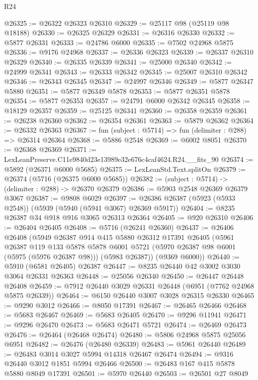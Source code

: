 \begin{lexlean}{R24}
\begin{coremodule}
@26325 := @26322 @26323 @26310
@26329 := @25117 @98 (@25119 @98 @18188)
@26330 := @26325 @26329
@26331 := @26316 @26330
@26332 := @5877 @26331
@26333 := @24786 @6000
@26335 := @7502 @24968 @5875
@26336 := @9176 @24968
@26337 := @26336 @26323
@26339 := @26337 @26310 @26329
@26340 := @26335 @26339
@26341 := @25000 @26340
@26342 := @24999 @26341
@26343 := @26333 @26342
@26345 := @25007 @26310 @26342
@26346 := @26343 @26345
@26347 := @24997 @26346
@26349 := @5877 @26347 @5880
@26351 := @5877 @26349 @5878
@26353 := @5877 @26351 @5878
@26354 := @5877 @26353
@26357 := @24791 @6000 @26342 @26345
@26358 := @18129 @26357
@26359 := @25125 @26341
@26360 := @26358 @26359
@26361 := @26238 @26360
@26362 := @26354 @26361
@26363 := @5879 @26362
@26364 := @26332 @26363
@26367 := fun (subject : @5714) => fun (delimiter : @288) => @26314 @26364
@26368 := @5886 @2548
@26369 := @6002 @8051
@26370 := @26368 @26369
@26371 := LexLeanPreserve.C11e9840d23e13989e32e676c4caf4624.R24.__fits_90
@26374 := @5892 (@26371 @6000 @5685)
@26375 := LexLeanStd.Text.splitOn
@26379 := @26374 (@5716 (@26375 @6000 @5685))
@26382 := (subject : @5714) -> (delimiter : @288) -> @26370 @26379
@26386 := @5903 @2548 @26369 @26379 @3067
@26387 := @9808 @6029
@26397 := @26386 @26387 (@5923 (@5933 @2548)) (@5939 (@5940 (@5941 @3067) @26369 @5917))
@26404 := @8235 @26387 @34 @918 @916 @3065 @26313 @26364
@26405 := @920 @26310
@26406 := @26404 @26405
@26408 := @5716 (@26241 @26360)
@26437 := @26406
    @26408
    (@5949
      @26387
      @914
      @415
      @5880
      @26312
      @17391
      @26405
      (@5961
        @26387
        @119
        @133
        @5878
        @5878
        @6001
        @5721
        (@5970 @26387 @98 @6001 (@5975 (@5976 @26387 @98)))
        (@5983 @26387))
      (@9369 @6000))
@26440 := @5910 (@6581 @26405) @26387
@26447 := @8235 @26440 @42 @3002 @3030 @3064 @26331 @26363
@26448 := @25056 @26340
@26450 := @26447 @26448 @26408
@26459 := @7912 @26440 @3029 @26331 @26448 (@6951 (@7762 @24968 @5875 @26339))
@26464 := @6150 @26440 @3007 @3028 @26315 @26330
@26465 := @9290 @3012
@26466 := @8050 @17391
@26467 := @26465 @26466
@26468 := @5683 @26467
@26469 := @5683 @26405
@26470 := @9296 @11941
@26471 := @9296 @26470
@26473 := @5683 @26471 @5721
@26474 := @26469 @26473
@26476 := @26464 (@26468 @26474)
@26480 := @5806 @24968 @5875 @25056 @6951
@26482 := @26476 (@26480 @26339)
@26483 := @5961 @26440
@26489 := @26483 @3014 @3027 @5994 @14318 @26467 @26474
@26494 := @9316 @26440 @3012 @1851 @5994 @26466
@26500 := @26483 @167 @415 @5878 @5880 @8049 @17391
@26501 := @5970 @26440
@26503 := @26501 @27 @8049

\end{coremodule}
\end{lexlean}
